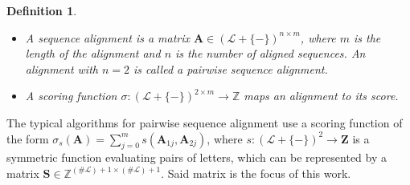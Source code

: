 \documentclass{article}
\newtheorem{definition}{Definition}
\begin{document}
\begin{multicols}{2}
\begin{definition}
\begin{itemize}
        \item A \emph{sequence alignment} is a matrix $\mathbf A \in
                  (\mathcal{L} + \{\mathtt{-}\})^{n \times m}$, where $m$ is the
              length of the alignment and $n$ is the number of aligned sequences.
	      An alignment with $n = 2$ is called a \emph{pairwise sequence alignment.}
      \item A scoring function $\sigma: (\mathcal{L} + \{\mathtt{-}\})^{2
                      \times m} \to \mathbb{Z}$ maps an alignment to its score.
    \end{itemize}
\end{definition}

The typical algorithms for pairwise sequence alignment use a scoring function of the form
$\sigma_s( \mathbf A )= \sum_{j=0}^m s(\mathbf A_{1j}, \mathbf A_{2j})$, where $s:
    (\mathcal L + \{\mathtt{-}\})^2 \to \mathbf{Z}$ is a symmetric function
evaluating pairs of letters, which can be represented by a matrix $\mathbf S
    \in \mathbb Z^{(\# \mathcal L) + 1 \times (\# \mathcal L) + 1}$. Said matrix is
the focus of this work.


\end{multicols}
\end{document}
